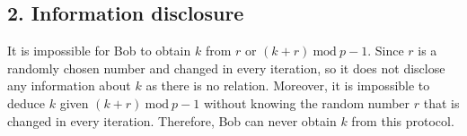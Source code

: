 \documentclass[runningheads]{llncs}
\begin{document}
\subsection*{2. Information disclosure}
It is impossible for Bob to obtain $k$ from $r$ or $(k+r)\ \text{mod}\ p-1$. 
Since $r$ is a randomly chosen number and changed in every iteration, so it does not disclose any information about $k$ as there is no relation. 
Moreover, it is impossible to deduce $k$ given $(k+r)\ \text{mod}\ p-1$ without knowing the random number $r$ that is changed in every iteration. 
Therefore, Bob can never obtain $k$ from this protocol.

\clearpage
\end{document}
